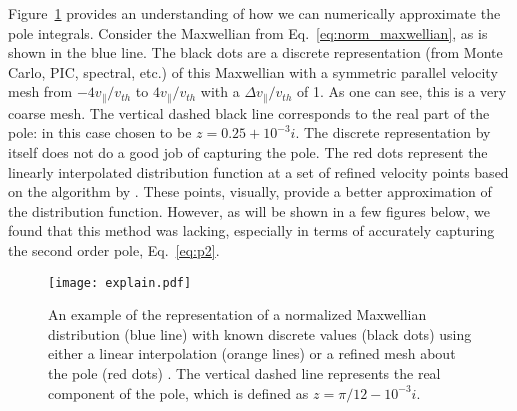 Figure~\ref{f:explainIntegrationMethod} provides an understanding of how we can numerically approximate the pole integrals.
Consider the Maxwellian from Eq.~\ref{eq:norm_maxwellian}, as is shown in the blue line.
The black dots are a discrete representation (from Monte Carlo, PIC, spectral, etc.) of this Maxwellian with a symmetric parallel velocity
mesh from $-4v_\parallel/v_{th}$ to $4v_\parallel/v_{th}$ with a $\Delta v_\parallel/v_{th}$ of 1.
As one can see, this is a very coarse mesh. 
The vertical dashed black line corresponds to the real part of the pole: in this case chosen to be $z=0.25+10^{-3}i$.
The discrete representation by itself does not do a good job of capturing the pole.
The red dots represent the linearly interpolated distribution function at a set of refined velocity points based on the algorithm by \cite{longley2024}.
These points, visually, provide a better approximation of the distribution function.
However, as will be shown in a few figures below, we found that this method was lacking, especially in terms of accurately capturing the second order pole, Eq.~\ref{eq:p2}.


\begin{figure}[!htb]
	\centering
	\texttt{[image: explain.pdf]}
	\caption{An example of the representation of a normalized Maxwellian distribution (blue line) with 
	known discrete values (black dots) using either a linear interpolation (orange lines)
	or a refined mesh about the pole (red dots) \citep{longley2024}.
	The vertical dashed line represents the real component of the pole, which is defined as $z=\pi/12-10^{-3}i$.}
	\label{f:explainIntegrationMethod}
\end{figure}

